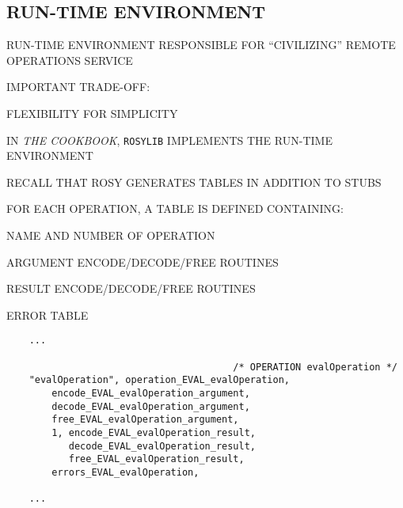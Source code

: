 \begin{bwslide}
\part*	{RUN-TIME ENVIRONMENT}\bf

\begin{nrtc}
\item	RUN-TIME ENVIRONMENT RESPONSIBLE FOR ``CIVILIZING'' REMOTE OPERATIONS
	SERVICE

\item	IMPORTANT TRADE-OFF:
    \begin{nrtc}
    \item	FLEXIBILITY FOR SIMPLICITY
    \end{nrtc}

\item	IN \emph{THE COOKBOOK}, \verb"ROSYLIB" IMPLEMENTS THE RUN-TIME
	ENVIRONMENT
\end{nrtc}
\end{bwslide}


\begin{bwslide}

\begin{nrtc}
\item	RECALL THAT ROSY GENERATES TABLES IN ADDITION TO STUBS

\item	FOR EACH OPERATION, A TABLE IS DEFINED CONTAINING:
    \begin{nrtc}
    \item	NAME AND NUMBER OF OPERATION

    \item	ARGUMENT ENCODE/DECODE/FREE ROUTINES

    \item	RESULT ENCODE/DECODE/FREE ROUTINES

    \item	ERROR TABLE
    \end{nrtc}
\end{nrtc}\small

\begin{verbatim}
    ...

                                        /* OPERATION evalOperation */
    "evalOperation", operation_EVAL_evalOperation,
        encode_EVAL_evalOperation_argument,
        decode_EVAL_evalOperation_argument,
        free_EVAL_evalOperation_argument,
        1, encode_EVAL_evalOperation_result,
           decode_EVAL_evalOperation_result,
           free_EVAL_evalOperation_result,
        errors_EVAL_evalOperation,

    ...
\end{verbatim}
\end{bwslide}


